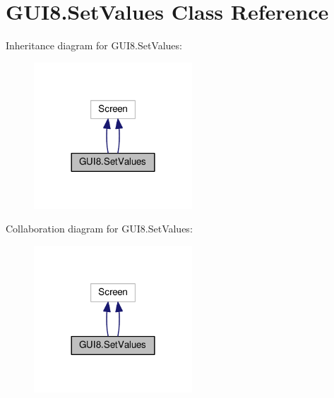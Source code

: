 \hypertarget{classGUI8_1_1SetValues}{}\section{G\+U\+I8.\+Set\+Values Class Reference}
\label{classGUI8_1_1SetValues}


Inheritance diagram for G\+U\+I8.\+Set\+Values\+:
\nopagebreak
\begin{figure}[H]
\begin{center}
\leavevmode
\includegraphics[width=168pt]{classGUI8_1_1SetValues__inherit__graph}
\end{center}
\end{figure}


Collaboration diagram for G\+U\+I8.\+Set\+Values\+:
\nopagebreak
\begin{figure}[H]
\begin{center}
\leavevmode
\includegraphics[width=168pt]{classGUI8_1_1SetValues__coll__graph}
\end{center}
\end{figure}
